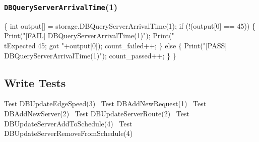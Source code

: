 \documentclass{article}
\def\nwendcode{\endtrivlist \endgroup}
\let\nwdocspar=\par
\begin{document}
\subsubsection{{\tt{}DBQueryServerArrivalTime}(1)}
\nwenddocs{}\endmoddef{}
\{
  int output[] = storage.DBQueryServerArrivalTime(1);
  if (!(output[0] == 45)) \{
    Print("[FAIL] DBQueryServerArrivalTime(1)");
    Print("\\tExpected 45; got "+output[0]);
    count_failed++;
  \} else \{
    Print("[PASS] DBQueryServerArrivalTime(1)");
    count_passed++;
  \}
\}
\nwendcode{}\nwdocspar

\subsection{Write Tests}
\label{sec:write-tests}
\nwenddocs{}\endmoddef{}
\LA{}Test \code{}DBUpdateEdgeSpeed\edoc{}(3)~{\nwtagstyle{}}\RA{}
\LA{}Test \code{}DBAddNewRequest\edoc{}(1)~{\nwtagstyle{}}\RA{}
\LA{}Test \code{}DBAddNewServer\edoc{}(2)~{\nwtagstyle{}}\RA{}
\LA{}Test \code{}DBUpdateServerRoute\edoc{}(2)~{\nwtagstyle{}}\RA{}
\LA{}Test \code{}DBUpdateServerAddToSchedule\edoc{}(4)~{\nwtagstyle{}}\RA{}
\LA{}Test \code{}DBUpdateServerRemoveFromSchedule\edoc{}(4)~{\nwtagstyle{}}\RA{}
\nwendcode{}\nwdocspar
\end{document}
